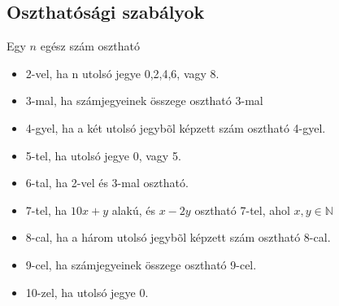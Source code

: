 \documentclass[twoside,12pt]{report}
\theoremstyle{definition}
\begin{document}
	\subsection{Oszthatósági szabályok}
	Egy $n$ egész szám osztható
	\begin{itemize}
		\item 2-vel, ha n utolsó jegye 0,2,4,6, vagy 8.
		\item 3-mal, ha számjegyeinek összege osztható 3-mal
		\item 4-gyel, ha a két utolsó jegybõl képzett szám osztható 4-gyel.
		\item 5-tel, ha utolsó jegye 0, vagy 5.
		\item 6-tal, ha 2-vel és 3-mal osztható.
		\item 7-tel, ha $10x+y$ alakú, és $x-2y$ osztható 7-tel, ahol $x,y\in\mathbb{N}$
		\item 8-cal, ha a három utolsó jegybõl képzett szám osztható 8-cal.
		\item 9-cel, ha számjegyeinek összege osztható 9-cel.
		\item 10-zel, ha utolsó jegye 0.
	\end{itemize}
\end{document}
